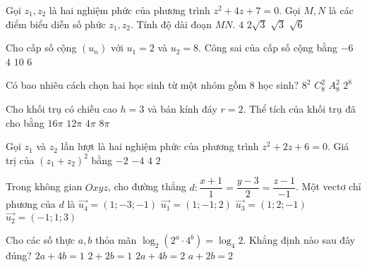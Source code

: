\begin{ex}%
{\vspace{-0.4cm}

}
\end{ex}
\begin{ex}%
Gọi $z_1, z_2$ là hai nghiệm phức của phương trình $z^2+4 z+7=0$. Gọi $M, N$ là các điểm biểu diễn số phức $z_1, z_2$. Tính độ dài đoạn $MN$.
\choice
{$4$}
{\True $2\sqrt{3}$}
{$\sqrt{3}$}
{$\sqrt{6}$}

\end{ex}
\begin{ex}%
Cho cấp số cộng $\left(u_n\right)$ với $u_1=2$ và $u_2=8$. Công sai của cấp số cộng bằng
\choice
{\True $-6$}
{$4$}
{$10$}
{$6$}

\end{ex}
\begin{ex}%
Có bao nhiêu cách chọn hai học sinh từ một nhóm gồm $8$ học sinh?
\choice
{$8^2$}
{\True $C_8^2$}
{$A_8^2$}
{$2^8$}

\end{ex}
\begin{ex}%
Cho khối trụ có chiều cao $h=3$ và bán kính đáy $r=2$. Thể tích của khối trụ đã cho bằng
\choice
{$16\pi$}
{\True $12\pi$}
{$4\pi$}
{$8\pi$}

\end{ex}
\begin{ex}%
Gọi $z_1$ và $z_2$ lần lượt là hai nghiệm phức của phương trình $z^2+ 2 z+6=0$. Giá trị của $\left(z_1+z_2\right)^2$ bằng
\choice
{$-2$}
{$-4$}
{\True $4$}
{$2$}

\end{ex}
\begin{ex}%
Trong không gian $O x y z$, cho đường thẳng $d\colon \dfrac{x+1}{1}=\dfrac{y-3}{2}=\dfrac{z-1}{-1}$. Một vectơ chỉ phương của $d$ là
\choice
{$\overrightarrow{u_4}=(1;-3;-1)$}
{\True $\overrightarrow{u_1}=(1;-1; 2)$}
{$\overrightarrow{u_3}=(1; 2;-1)$}
{$\overrightarrow{u_2}=(-1; 1; 3)$}

\end{ex}
\begin{ex}%
Cho các số thực $a, b$ thỏa mãn $\log_2\left(2^{a} \cdot 4^{b}\right)=\log_4 2$. Khẳng định nào sau đây đúng?
\choice
{\True $2 a+4 b=1$}
{$2+2 b=1$}
{$2 a+4 b=2$}
{$a+2 b=2$}

\end{ex}
